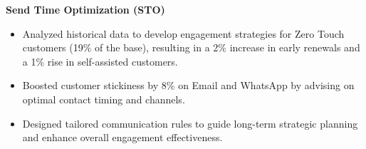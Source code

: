 \textbf{Send Time Optimization (STO)}
\begin{itemize}
    \item Analyzed historical data to develop engagement strategies for Zero Touch customers (19\% of the base), resulting in a 2\% increase in early renewals and a 1\% rise in self-assisted customers.
    \item Boosted customer stickiness by 8\% on Email and WhatsApp by advising on optimal contact timing and channels.
    \item Designed tailored communication rules to guide long-term strategic planning and enhance overall engagement effectiveness.
\end{itemize}
